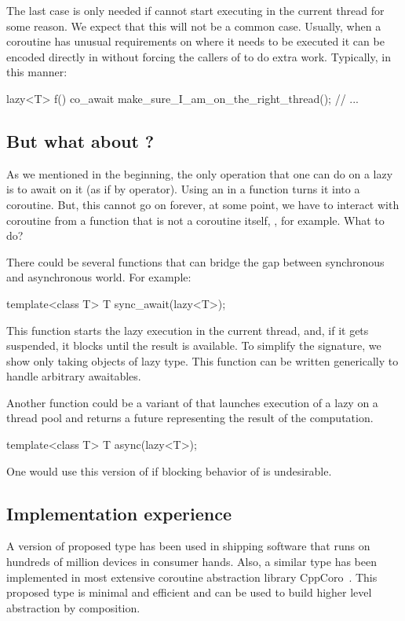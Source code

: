 The last case is only needed if  cannot start executing in the current thread for some reason. We expect that this will not be a common case. Usually, when a coroutine has unusual requirements on where it needs to be executed it can be encoded directly in  without forcing the callers of  to do extra work. Typically, in this manner:
\begin{codeblock}
lazy<T> f() {
  co_await make_sure_I_am_on_the_right_thread();
  // ...
}
\end{codeblock}

\subsection{But what about ?}
As we mentioned in the beginning, the only operation that one can do on a lazy is to await on it (as if by  operator). Using an  in a function turns it into a coroutine. But, this cannot go on forever, at some point, we have to interact with coroutine from a function that is not a coroutine itself, , for example. What to do?

There could be several functions that can bridge the gap between synchronous and asynchronous world. For example:
\begin{codeblock}
template<class T> T sync_await(lazy<T>);
\end{codeblock}
This function starts the lazy execution in the current thread, and, if it gets suspended, it blocks until the result is available. To simplify the signature, we show  only taking objects of lazy type. This function can be written generically to handle arbitrary awaitables.

Another function could be a variant of  that launches execution of a lazy on a thread pool and returns a future representing the result of the computation.
\begin{codeblock}
template<class T> T async(lazy<T>);
\end{codeblock}
One would use this version of  if blocking behavior of  is undesirable.

\subsection{Implementation experience}

A version of proposed type has been used in shipping software that runs on hundreds of million devices in consumer hands. Also, a similar type has been implemented in most extensive coroutine abstraction library CppCoro~\cite{CppCoro}. This proposed type is minimal and efficient and can be used to build higher level abstraction by composition.

